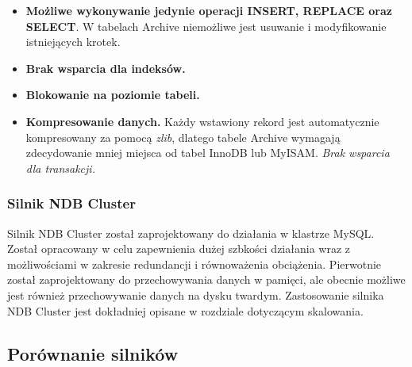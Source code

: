 \begin{itemize}
	\item \textbf{Możliwe wykonywanie jedynie operacji INSERT, REPLACE oraz SELECT}. W tabelach Archive niemożliwe jest usuwanie i modyfikowanie istniejących krotek.
	\item \textbf{Brak wsparcia dla indeksów.}
	\item \textbf{Blokowanie na poziomie tabeli.}
	\item \textbf{Kompresowanie danych.} Każdy wstawiony rekord jest automatycznie kompresowany za pomocą \textit{zlib}, dlatego tabele Archive wymagają zdecydowanie mniej miejsca od tabel InnoDB lub MyISAM.
	\textit{Brak wsparcia dla transakcji.}
\end{itemize}

\subsubsection{Silnik NDB Cluster}
Silnik NDB Cluster został zaprojektowany do działania w klastrze MySQL. Został opracowany w celu zapewnienia dużej szbkości działania wraz z możliwościami w zakresie redundancji i równoważenia obciążenia. Pierwotnie został zaprojektowany do przechowywania danych w pamięci, ale obecnie możliwe jest również przechowywanie danych na dysku twardym. Zastosowanie silnika NDB Cluster jest dokładniej opisane w rozdziale dotyczącym skalowania.

\subsection{Porównanie silników}




